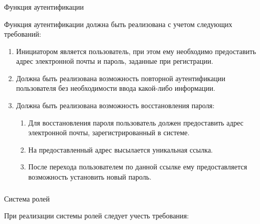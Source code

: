 \subsubsection{} Функция аутентификации
\label{sec:domain:specification:authentication}

Функция аутентификации должна быть реализована с учетом следующих требований:

\begin{enumerate}
	\item Инициатором является пользователь, при этом ему необходимо предоставить адрес электронной почты и пароль, заданные при регистрации.
	\item Должна быть реализована возможность повторной аутентификации пользователя без необходимости ввода какой-либо информации.
	\item Должна быть реализована возможность восстановления пароля:
	\begin{enumerate}
		\item Для восстановления пароля пользователь должен предоставить адрес электронной почты, зарегистрированный в системе.
		\item На предоставленный адрес высылается уникальная ссылка.
		\item После перехода пользователем по данной ссылке ему предоставляется возможность установить новый пароль.
	\end{enumerate}
\end{enumerate}

\subsubsection{} Система ролей
\label{sec:domain:specification:roles}

При реализации системы ролей следует учесть требования:

